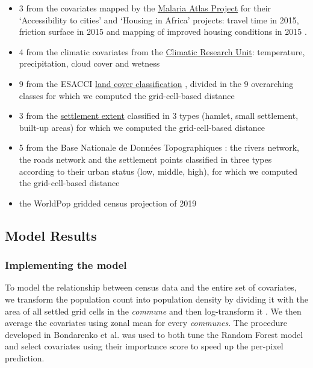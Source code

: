\documentclass[]{book}
\begin{document}
\begin{itemize}
\item
  3 from the covariates mapped by the
  \href{https://malariaatlas.org/}{Malaria Atlas Project} for their
  `Accessibility to cities' and `Housing in Africa' projects: travel
  time in 2015, friction surface in 2015 \citep{weiss2018global} and
  mapping of improved housing conditions in 2015
  \citep{tusting2019mapping}.
\item
  4 from the climatic covariates from the
  \href{https://catalogue.ceda.ac.uk/uuid/10d3e3640f004c578403419aac167d82}{Climatic
  Research Unit}: temperature, precipitation, cloud cover and wetness
  \citep{harris2020version}
\item
  9 from the ESACCI
  \href{https://land.copernicus.eu/global/products/lc}{land cover
  classification} \citep{marcel_buchhorn_2020_3939050}, divided in the 9
  overarching classes for which we computed the grid-cell-based distance
\item
  3 from the
  \href{https://academiccommons.columbia.edu/doi/10.7916/d8-h47k-8637}{settlement
  extent} \citep{network_grid3_2020} classified in 3 types (hamlet,
  small settlement, built-up areas) for which we computed the
  grid-cell-based distance
\item
  5 from the Base Nationale de Données Topographiques
  \citep{institutgeographiqueduburkinafaso2015}: the rivers network, the
  roads network and the settlement points classified in three types
  according to their urban status (low, middle, high), for which we
  computed the grid-cell-based distance
\item
  the WorldPop gridded census projection of 2019
  \citep{worldpop2018global}
\end{itemize}

\subsection{Model Results}\label{model-results-1}

\subsubsection{Implementing the model}\label{implementing-the-model-1}

To model the relationship between census data and the entire set of
covariates, we transform the population count into population density by
dividing it with the area of all settled grid cells in the
\emph{commune} and then log-transform it \citep{stevens2015}. We then
average the covariates using zonal mean for every \emph{communes}. The
procedure developed in Bondarenko et al.
\citeyearpar{bondarenko2018wpgprfpms} was used to both tune the Random
Forest model and select covariates using their importance score to speed
up the per-pixel prediction.
\end{document}

